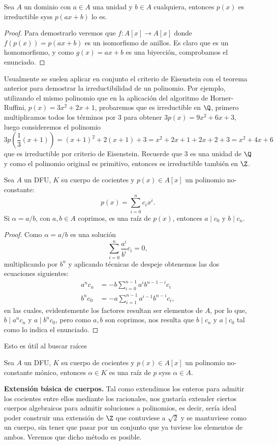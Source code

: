 \documentclass[11pt,oneside]{book}
\begin{document}
\begin{thm}
Sea $A$ un dominio con $a\in A$ una unidad y $b\in A$ cualquiera, entonces $p(x)$ es irreductible syss $p(ax+b)$ lo es.
\end{thm}
\begin{proof}
Para demostrarlo veremos que $f:A[x]\rightarrow A[x]$ donde $f(p(x))=p(ax+b)$ es un isomorfismo de anillos. Es claro que es un homomorfismo, y como $g(x)=ax+b$ es una biyección, comprobamos el enunciado.
\end{proof}
Usualmente se suelen aplicar en conjunto el criterio de Eisenstein con el teorema anterior para demostrar la irreductibilidad de un polinomio. Por ejemplo, utilizando el mismo polinomio que en la aplicación del algoritmo de Horner-Ruffini, $p(x)=3x^2+2x+1$, probaremos que es irreductible en $\Q$, primero multiplicamos todos los términos por 3 para obtener $3p(x)=9x^2+6x+3$, luego consideremos el polinomio
$$3p\left(\frac 13(x+1)\right)=(x+1)^2+2(x+1)+3=x^2+2x+1+2x+2+3=x^2+4x+6$$
que es irreductible por criterio de Eisenstein. Recuerde que 3 es una unidad de $\Q$ y como el polinomio original es primitivo, entonces es irreductible también en $\Z$.
\begin{thm}
Sea $A$ un DFU, $K$ su cuerpo de cocientes y $p(x)\in A[x]$ un polinomio no-constante:
$$p(x)=\sum_{i=0}^n c_ix^i.$$
Si $\alpha=a/b$, con $a,b\in A$ coprimos, es una raíz de $p(x)$, entonces $a\mid c_0$ y $b\mid c_n$.
\end{thm}
\begin{proof}
Como $\alpha=a/b$ es una solución
$$\sum_{i=0}^n\frac{a^i}{b^i}c_i=0,$$
multiplicando por $b^n$ y aplicando técnicas de despeje obtenemos las dos ecuaciones siguientes:
\begin{align*}
a^nc_n&=-b\sum_{i=0}^{n-1}a^ib^{n-1-i}c_i\\
b^nc_0&=-a\sum_{i=1}^{n-1}a^{i-1}b^{n-i}c_i,
\end{align*}
en las cuales, evidentemente los factores resultan ser elementos de $A$, por lo que, $b\mid a^nc_n$ y $a\mid b^nc_0$, pero como $a,b$ son coprimos, nos resulta que $b\mid c_n$ y $a\mid c_0$ tal como lo indica el enunciado.
\end{proof}
Esto es útil al buscar raíces 
\begin{cor}
Sea $A$ un DFU, $K$ su cuerpo de cocientes y $p(x)\in A[x]$ un polinomio no-constante mónico, entonces $\alpha\in K$ es una raíz de $p$ syss $\alpha\in A$.
\end{cor}
\textbf{Extensión básica de cuerpos.} Tal como extendimos los enteros para admitir los cocientes entre ellos mediante los racionales, nos gustaría extender ciertos cuerpos algebraicos para admitir soluciones a polinomios, es decir, sería ideal poder construir una extensión de $\Z$ que contuviese a $\sqrt{2}$ y se mantuviese como un cuerpo, sin tener que pasar por un conjunto que ya tuviese los elementos de ambos. Veremos que dicho método es posible.
\end{document}
